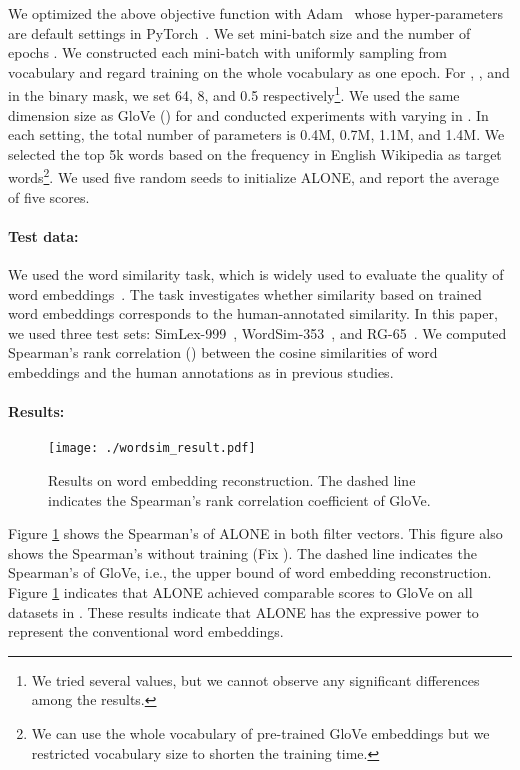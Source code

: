 \documentclass{article}
\begin{document}
We optimized the above objective function with Adam~\cite{DBLP:journals/corr/KingmaB14} whose hyper-parameters are default settings in PyTorch~\cite{NEURIPS2019_9015}.
We set mini-batch size  and the number of epochs .
We constructed each mini-batch with uniformly sampling from vocabulary and regard training on the whole vocabulary as one epoch.
For , , and  in the binary mask, we set 64, 8, and 0.5 respectively\footnote{We tried several values, but we cannot observe any significant differences among the results.}.
We used the same dimension size as GloVe () for  and conducted experiments with varying  in .
In each setting, the total number of parameters is 0.4M, 0.7M, 1.1M, and 1.4M.
We selected the top 5k words based on the frequency in English Wikipedia as target words\footnote{We can use the whole vocabulary of pre-trained GloVe embeddings but we restricted vocabulary size to shorten the training time.}.
We used five random seeds to initialize ALONE, and report the average of five scores.


\paragraph{Test data:}
We used the word similarity task, which is widely used to evaluate the quality of word embeddings~\cite{pennington2014glove,faruqui-etal-2015-retrofitting,wieting-etal-2016-charagram}.
The task investigates whether similarity based on trained word embeddings corresponds to the human-annotated similarity.
In this paper, we used three test sets: SimLex-999~\cite{hill-etal-2015-simlex}, WordSim-353~\cite{WordSim353:Finkelstein:WWW:2001}, and RG-65~\cite{rubenstein1965contextual}.
We computed Spearman's rank correlation () between the cosine similarities of word embeddings and the human annotations as in previous studies.


\paragraph{Results:}

\begin{figure}[!t]
  \centering
  \texttt{[image: ./wordsim\_result.pdf]}
   \caption{Results on word embedding reconstruction. The dashed line indicates the Spearman's rank correlation coefficient of GloVe.}
   \label{fig:word_sim_result}
\end{figure}


Figure \ref{fig:word_sim_result} shows the Spearman's  of ALONE in both filter vectors.
This figure also shows the Spearman's  without training  (Fix ).
The dashed line indicates the Spearman's  of GloVe, i.e., the upper bound of word embedding reconstruction.
Figure \ref{fig:word_sim_result} indicates that ALONE achieved comparable scores to GloVe on all datasets in .
These results indicate that ALONE has the expressive power to represent the conventional word embeddings.
\end{document}
